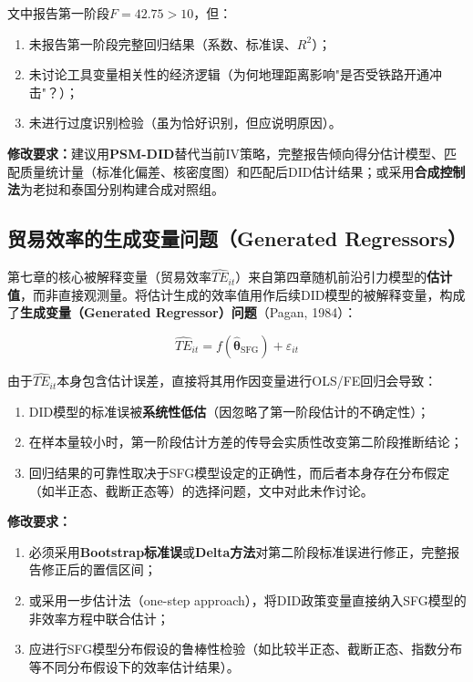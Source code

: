 \documentclass[12pt, a4paper]{article}
\begin{document}
\begin{criticalbox}
文中报告第一阶段$F = 42.75 > 10$，但：
\begin{enumerate}[label=(\alph*)]
  \item 未报告第一阶段完整回归结果（系数、标准误、$R^2$）；
  \item 未讨论工具变量相关性的经济逻辑（为何地理距离影响"是否受铁路开通冲击"？）；
  \item 未进行过度识别检验（虽为恰好识别，但应说明原因）。
\end{enumerate}

\textbf{修改要求：}建议用\textbf{PSM-DID}替代当前IV策略，完整报告倾向得分估计模型、匹配质量统计量（标准化偏差、核密度图）和匹配后DID估计结果；或采用\textbf{合成控制法}为老挝和泰国分别构建合成对照组。
\end{criticalbox}

\subsection{贸易效率的生成变量问题（Generated Regressors）}
\label{sec:generated_regressor}

\begin{criticalbox}

第七章的核心被解释变量（贸易效率$\widehat{TE}_{it}$）来自第四章随机前沿引力模型的\textbf{估计值}，而非直接观测量。将估计生成的效率值用作后续DID模型的被解释变量，构成了\textbf{生成变量（Generated Regressor）问题}（Pagan, 1984）：

\begin{equation}
  \widehat{TE}_{it} = f(\hat{\boldsymbol{\theta}}_{\text{SFG}}) + \varepsilon_{it}
  \label{eq:generated_var}
\end{equation}

由于$\widehat{TE}_{it}$本身包含估计误差，直接将其用作因变量进行OLS/FE回归会导致：
\begin{enumerate}[label=(\alph*)]
  \item DID模型的标准误被\textbf{系统性低估}（因忽略了第一阶段估计的不确定性）；
  \item 在样本量较小时，第一阶段估计方差的传导会实质性改变第二阶段推断结论；
  \item 回归结果的可靠性取决于SFG模型设定的正确性，而后者本身存在分布假定（如半正态、截断正态等）的选择问题，文中对此未作讨论。
\end{enumerate}

\textbf{修改要求：}
\begin{enumerate}[label=(\alph*)]
  \item 必须采用\textbf{Bootstrap标准误}或\textbf{Delta方法}对第二阶段标准误进行修正，完整报告修正后的置信区间；
  \item 或采用一步估计法（one-step approach），将DID政策变量直接纳入SFG模型的非效率方程中联合估计；
  \item 应进行SFG模型分布假设的鲁棒性检验（如比较半正态、截断正态、指数分布等不同分布假设下的效率估计结果）。
\end{enumerate}
\end{criticalbox}
\end{document}
